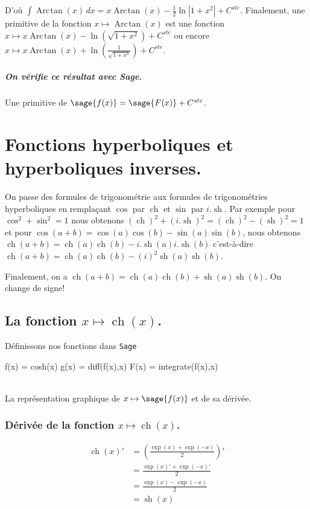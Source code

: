 \documentclass[a4paper,12pt]{report}
\renewcommand{\sinh}{\mathop{\mathrm{sh}}}
\renewcommand{\cosh}{\mathop{\mathrm{ch}}}
\renewcommand{\arctan}{\mathop{\mathrm{Arc\mspace{2mu}tan}}}
\begin{document}
D'où $\int \arctan(x) \, dx = x \arctan(x) - \frac{1}{2} \ln \left| 1+ x^2 \right| + C^{ste} $. 
Finalement, une primitive de la fonction $x \mapsto \arctan(x) $ est une fonction $x \mapsto x \arctan(x) -\ln\left( \sqrt{1+ x^2}\right) + C^{ste} $ ou encore $x \mapsto x \arctan(x) +\ln\left( \frac{1}{\sqrt{1+ x^2}}\right) + C^{ste} $.
\paragraph{On vérifie ce résultat avec Sage.}
Une primitive de $\sage{f(x)} = \sage{F(x)} + C^{ste}$.


\chapter{Fonctions hyperboliques et hyperboliques inverses.}


On passe des formules de trigonométrie aux formules de trigonométries hyperboliques en remplaçant $\cos$ par $\cosh$ et $\sin$ par $i . \sinh$. Par exemple pour $\cos^2+\sin^2=1$
nous obtenons $(\cosh)^2 + (i . \sinh)^2= (\cosh)^2 - (\sinh)^2 = 1$ et pour $\cos(a+b)=\cos(a) \cos(b) - \sin(a) \sin(b) $, nous obtenons $\cosh(a+b)=\cosh(a) \cosh(b) - i .\sinh(a) i . \sinh(b) $ c'est-à-dire $\cosh(a+b)=\cosh(a) \cosh(b) - (i)^2 \sinh(a) \sinh(b) $.  

Finalement, on a $\cosh(a+b) = \cosh(a) \cosh(b) + \sinh(a) \sinh(b) $. On change de signe!


\section{La fonction  $x \mapsto \cosh(x)$.}

Définissons nos fonctions dans {\texttt{Sage}}
\begin{sageblock}
    f(x) = cosh(x)
    g(x) = diff(f(x),x)
    F(x) = integrate(f(x),x)
\end{sageblock}



\begin{center}
 \\
La représentation graphique de $x \mapsto \sage{f(x)} $ et de sa dérivée. 
\end{center}

\subsection{Dérivée de la fonction $x \mapsto \cosh(x)$.}
\begin{align*}
\cosh(x)' & = \left( \frac{\exp(x)+\exp(-x)}{2} \right)' \\ 
& = \frac{\exp(x)'+\exp(-x)'}{2} \\
& = \frac{\exp(x)-\exp(-x)}{2} \\
& = \sinh(x)
\end{align*}
\end{document}
